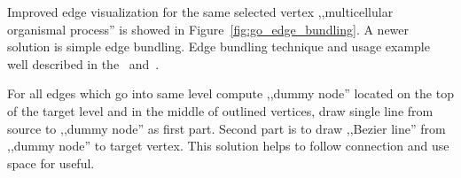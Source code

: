 Improved edge visualization for the same selected vertex ,,multicellular organismal process'' is showed in Figure~\ref{fig:go_edge_bundling}. A newer solution is simple edge bundling. Edge bundling technique and usage example well described in the~\cite{EDGE_BUNDLING_1} and~\cite{EDGE_BUNDLING_2}.

For all edges which go into same level compute ,,dummy node'' located on the top of the target level and in the middle of outlined vertices, draw single line from source to ,,dummy node'' as first part. Second part is to draw ,,Bezier line'' from ,,dummy node'' to target vertex. This solution helps to follow connection and use space for useful. 